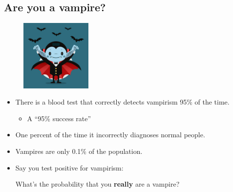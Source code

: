 \documentclass[dvipsnames,mathserif, handout]{beamer}
\begin{document}
{%
%
%

\subsection{Are you a vampire?}

\begin{frame}
    \begin{figure}[!ht]
    	\includegraphics[width=100pt]{Vampire.jpg}
    \end{figure}
    
    \begin{itemize}
    	\item There is a blood test that correctly detects vampirism 95\% of the time.
	\begin{itemize}
		\item \footnotesize A ``95\% success rate''
	\end{itemize}
    	\item One percent of the time it incorrectly diagnoses normal people.
    	\item Vampires are only 0.1\% of the population.
    	\item Say you test positive for vampirism:
    	\begin{block}{}
    		\centering
    		What's the probability that you \textbf{really} are a vampire?
    	\end{block}
    \end{itemize}
\end{frame}

}
\end{document}
